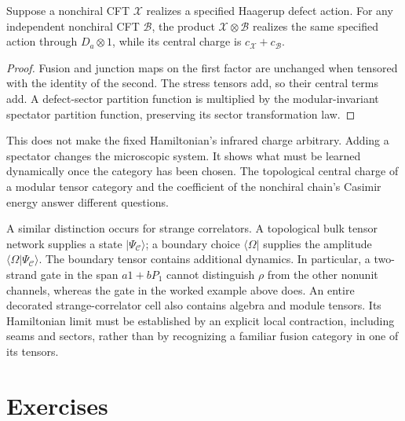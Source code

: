 \begin{proposition}
Suppose a nonchiral CFT $\mathcal X$ realizes a specified Haagerup defect
action. For any independent nonchiral CFT $\mathcal B$, the product
$\mathcal X\otimes\mathcal B$ realizes the same specified action through
$D_a\otimes1$, while its central charge is $c_{\mathcal X}+c_{\mathcal B}$.
\end{proposition}
\begin{proof}
Fusion and junction maps on the first factor are unchanged when tensored
with the identity of the second. The stress tensors add, so their central
terms add. A defect-sector partition function is multiplied by the
modular-invariant spectator partition function, preserving its sector
transformation law.\end{proof}

This does not make the fixed Hamiltonian's infrared charge arbitrary.
Adding a spectator changes the microscopic system. It shows what must be
learned dynamically once the category has been chosen. The topological
central charge of a modular tensor category and the coefficient of the
nonchiral chain's Casimir energy answer different questions.

A similar distinction occurs for strange correlators. A topological bulk
tensor network supplies a state $|\Psi_{\mathcal C}\rangle$; a boundary
choice $\langle\Omega|$ supplies the amplitude
$\langle\Omega|\Psi_{\mathcal C}\rangle$. The boundary tensor contains
additional dynamics. In particular, a two-strand gate in the span
$a1+bP_1$ cannot distinguish $\rho$ from the other nonunit channels,
whereas the gate in the worked example above does. An entire decorated
strange-correlator cell also contains algebra and module tensors. Its
Hamiltonian limit must be established by an explicit local contraction,
including seams and sectors, rather than by recognizing a familiar
fusion category in one of its tensors.

\section{Exercises}


